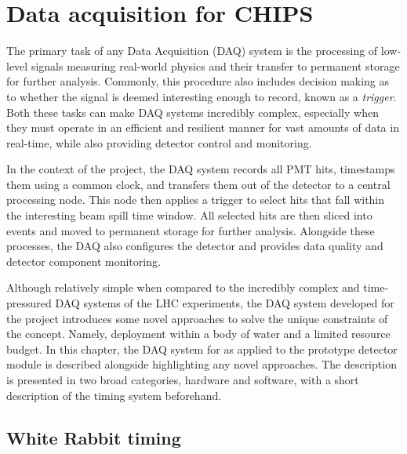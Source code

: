 \chapter{Data acquisition for CHIPS} %
\label{chap:daq} %

The primary task of any Data Acquisition (DAQ) system is the processing of low-level signals
measuring real-world physics and their transfer to permanent storage for further analysis.
Commonly, this procedure also includes decision making as to whether the signal is deemed
interesting enough to record, known as a \emph{trigger}. Both these tasks can make DAQ systems
incredibly complex, especially when they must operate in an efficient and resilient manner for
vast amounts of data in real-time, while also providing detector control and monitoring.

In the context of the \chips project, the DAQ system records all PMT hits, timestamps them using a
common clock, and transfers them out of the detector to a central processing node. This node then
applies a trigger to select hits that fall within the interesting \numi beam spill time window.
All selected hits are then sliced into events and moved to permanent storage for further analysis.
Alongside these processes, the DAQ also configures the detector and provides data quality and
detector component monitoring.

Although relatively simple when compared to the incredibly complex and time-pressured DAQ systems
of the LHC experiments, the DAQ system developed for the \chips project introduces some novel
approaches to solve the unique constraints of the \chips concept. Namely, deployment within a body
of water and a limited resource budget. In this chapter, the DAQ system for \chips as applied to
the \chipsfive prototype detector module is described alongside highlighting any novel approaches.
The description is presented in two broad categories, hardware and software, with a short
description of the timing system beforehand.

\section{White Rabbit timing} %
\label{sec:daq_timing} %

